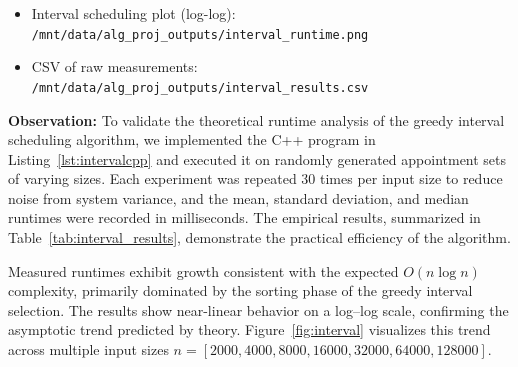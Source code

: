 \documentclass[conference]{IEEEtran}
\begin{document}

\begin{itemize}
    \item Interval scheduling plot (log-log): \texttt{/mnt/data/alg_proj_outputs/interval_runtime.png}
    \item CSV of raw measurements: \texttt{/mnt/data/alg_proj_outputs/interval_results.csv}
\end{itemize}

\textbf{Observation:} 
To validate the theoretical runtime analysis of the greedy interval scheduling algorithm, we implemented the C++ program in Listing~\ref{lst:intervalcpp} and executed it on randomly generated appointment sets of varying sizes. Each experiment was repeated 30 times per input size to reduce noise from system variance, and the mean, standard deviation, and median runtimes were recorded in milliseconds. The empirical results, summarized in Table~\ref{tab:interval_results}, demonstrate the practical efficiency of the algorithm.

Measured runtimes exhibit growth consistent with the expected $O(n \log n)$ complexity, primarily dominated by the sorting phase of the greedy interval selection. The results show near-linear behavior on a log–log scale, confirming the asymptotic trend predicted by theory. Figure~\ref{fig:interval} visualizes this trend across multiple input sizes $n = [2000, 4000, 8000, 16000, 32000, 64000, 128000]$.
\end{document}
